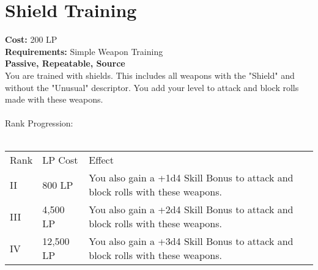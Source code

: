 \section{Shield Training}\label{perk:shieldTraining}
\textbf{Cost:} 200 LP\\
\textbf{Requirements:} Simple Weapon Training\\
\textbf{Passive, Repeatable, Source}\\
You are trained with shields.
This includes all weapons with the "Shield" and without the "Unusual" descriptor.
You add your level to attack and block rolls made with these weapons.\\
\\
Rank Progression:\\
\\
\begin{longtable}{l | l | p{9cm}}
	Rank & LP Cost & Effect\\
	II & 800 LP & You also gain a +1d4 Skill Bonus to attack and block rolls with these weapons.\\
	III & 4,500 LP & You also gain a +2d4 Skill Bonus to attack and block rolls with these weapons.\\
	IV & 12,500 LP & You also gain a +3d4 Skill Bonus to attack and block rolls with these weapons.\\
\end{longtable}
